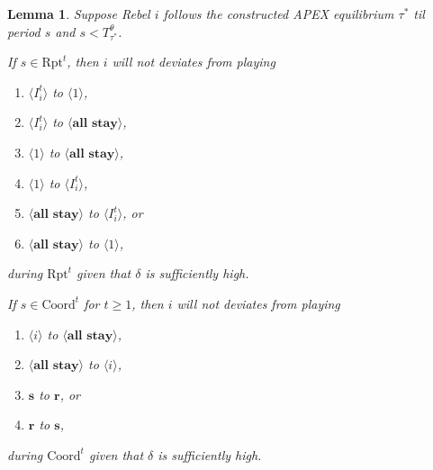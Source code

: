 \documentclass[12pt,letter]{article}
\newcommand{\subscript}[2]{$#1 _ #2$}
\newcommand{\Kappa}{\mathrm{Coord}}
\newcommand{\Omicron}{\mathrm{Rpt}}
\newtheorem{lemma}{Lemma}[section]
\theoremstyle{definition}
\theoremstyle{remark}
\theoremstyle{claim}
\begin{document}
\begin{lemma} Suppose Rebel $i$ follows the constructed APEX equilibrium $\tau^{*}$ til period $s$ and $s<T^{\theta}_{\tau^{*}}$. 

If $s\in\Omicron^t$, then $i$ will not deviates from playing
\begin{enumerate}[label=(\subscript{o}{{\arabic*}})]
\item $\langle I^{t}_i \rangle$ to $\langle 1 \rangle$,
\item $\langle I^{t}_i \rangle$ to $\langle \textbf{all stay} \rangle$,
\item $\langle 1 \rangle$ to $\langle \textbf{all stay} \rangle$,
\item $\langle 1 \rangle$ to $\langle I^{t}_i \rangle$,
\item $\langle \textbf{all stay} \rangle$ to $\langle I^{t}_i \rangle$, or
\item $\langle \textbf{all stay} \rangle$ to $\langle 1 \rangle$,
\end{enumerate}
during $\Omicron^t$ given that $\delta$ is sufficiently high. 

If $s\in\Kappa^t$ for $t\geq 1$, then $i$ will not deviates from playing
\begin{enumerate}[label=(\subscript{c}{{\arabic*}})]
\item $\langle i \rangle$ to $\langle \textbf{all stay} \rangle$,
\item $\langle \textbf{all stay} \rangle$ to $\langle i \rangle$,
\item $\textbf{s}$ to $\textbf{r}$, or
\item $\textbf{r}$ to $\textbf{s}$,
\end{enumerate}
during $\Kappa^t$ given that $\delta$ is sufficiently high.
\end{lemma}
\end{document}
